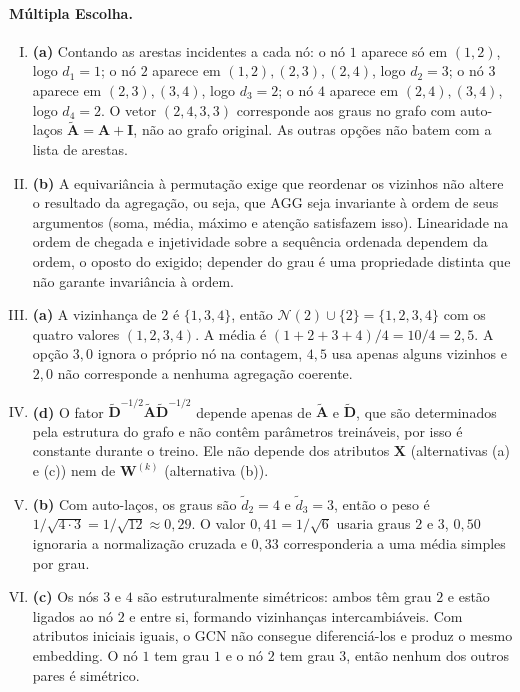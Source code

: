 \documentclass{dlproblemset}
\begin{document}
\paragraph{Múltipla Escolha.}
\begin{enumerate}[I)]
    \item \textbf{(a)} Contando as arestas incidentes a cada nó: o nó $1$ aparece só em $(1,2)$, logo $d_1 = 1$; o nó $2$ aparece em $(1,2),(2,3),(2,4)$, logo $d_2 = 3$; o nó $3$ aparece em $(2,3),(3,4)$, logo $d_3 = 2$; o nó $4$ aparece em $(2,4),(3,4)$, logo $d_4 = 2$. O vetor $(2,4,3,3)$ corresponde aos graus no grafo com auto-laços $\tilde{\mathbf{A}} = \mathbf{A} + \mathbf{I}$, não ao grafo original. As outras opções não batem com a lista de arestas.

    \item \textbf{(b)} A equivariância à permutação exige que reordenar os vizinhos não altere o resultado da agregação, ou seja, que $\mathrm{AGG}$ seja invariante à ordem de seus argumentos (soma, média, máximo e atenção satisfazem isso). Linearidade na ordem de chegada e injetividade sobre a sequência ordenada dependem da ordem, o oposto do exigido; depender do grau é uma propriedade distinta que não garante invariância à ordem.

    \item \textbf{(a)} A vizinhança de $2$ é $\{1,3,4\}$, então $\mathcal{N}(2) \cup \{2\} = \{1,2,3,4\}$ com os quatro valores $(1,2,3,4)$. A média é $(1+2+3+4)/4 = 10/4 = 2{,}5$. A opção $3{,}0$ ignora o próprio nó na contagem, $4{,}5$ usa apenas alguns vizinhos e $2{,}0$ não corresponde a nenhuma agregação coerente.

    \item \textbf{(d)} O fator $\tilde{\mathbf{D}}^{-1/2} \tilde{\mathbf{A}} \tilde{\mathbf{D}}^{-1/2}$ depende apenas de $\tilde{\mathbf{A}}$ e $\tilde{\mathbf{D}}$, que são determinados pela estrutura do grafo e não contêm parâmetros treináveis, por isso é constante durante o treino. Ele não depende dos atributos $\mathbf{X}$ (alternativas (a) e (c)) nem de $\mathbf{W}^{(k)}$ (alternativa (b)).

    \item \textbf{(b)} Com auto-laços, os graus são $\tilde d_2 = 4$ e $\tilde d_3 = 3$, então o peso é $1/\sqrt{4 \cdot 3} = 1/\sqrt{12} \approx 0{,}29$. O valor $0{,}41 = 1/\sqrt{6}$ usaria graus $2$ e $3$, $0{,}50$ ignoraria a normalização cruzada e $0{,}33$ corresponderia a uma média simples por grau.

    \item \textbf{(c)} Os nós $3$ e $4$ são estruturalmente simétricos: ambos têm grau $2$ e estão ligados ao nó $2$ e entre si, formando vizinhanças intercambiáveis. Com atributos iniciais iguais, o GCN não consegue diferenciá-los e produz o mesmo embedding. O nó $1$ tem grau $1$ e o nó $2$ tem grau $3$, então nenhum dos outros pares é simétrico.


\end{enumerate}
\end{document}
